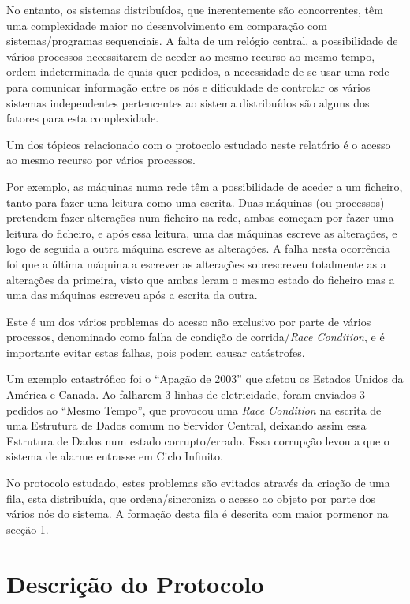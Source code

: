 No entanto, os sistemas distribuídos, que inerentemente são concorrentes, têm uma complexidade maior no desenvolvimento em comparação com sistemas/programas sequenciais.
A falta de um relógio central, a possibilidade de vários processos necessitarem de aceder ao mesmo recurso ao mesmo tempo, ordem indeterminada de quais quer pedidos, a necessidade de se usar uma rede para comunicar informação entre os nós e dificuldade de controlar os vários sistemas independentes pertencentes ao sistema distribuídos são alguns dos fatores para esta complexidade.

Um dos tópicos relacionado com o protocolo estudado neste relatório é o acesso ao mesmo recurso por vários processos.

Por exemplo, as máquinas numa rede têm a possibilidade de aceder a um ficheiro, tanto para fazer uma leitura como uma escrita.
Duas máquinas (ou processos) pretendem fazer alterações num ficheiro na rede, ambas começam por fazer uma leitura do ficheiro, e após essa leitura, uma das máquinas escreve as alterações, e logo de seguida a outra máquina escreve as alterações. A falha nesta ocorrência foi que a última máquina a escrever as alterações sobrescreveu totalmente as a alterações da primeira, visto que ambas leram o mesmo estado do ficheiro mas a uma das máquinas escreveu após a escrita da outra.

Este é um dos vários problemas do acesso não exclusivo por parte de vários processos, denominado como falha de condição de corrida/\emph{Race Condition}, e é importante evitar estas falhas, pois podem causar catástrofes. 

Um exemplo catastrófico foi o ``Apagão de 2003'' que afetou os Estados Unidos da América e Canada. Ao falharem 3 linhas de eletricidade, foram enviados 3 pedidos ao ``Mesmo Tempo'', que provocou uma \emph{Race Condition} na escrita de uma Estrutura de Dados comum no Servidor Central, deixando assim essa Estrutura de Dados num estado corrupto/errado. Essa corrupção levou a que o sistema de alarme entrasse em Ciclo Infinito.

No protocolo estudado, estes problemas são evitados através da criação de uma fila, esta distribuída, que ordena/sincroniza o acesso ao objeto por parte dos vários nós do sistema.
A formação desta fila é descrita com maior pormenor na secção \ref{motivacao:sec:descricao_protocolo}. 

\section{Descrição do Protocolo}
\label{motivacao:sec:descricao_protocolo}


